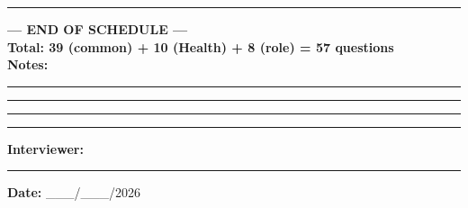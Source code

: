 \documentclass[10pt,a4paper]{article}
\begin{document}
\vspace{3pt}\noindent\rule{\textwidth}{1pt}
\begin{center}
{\large\bfseries --- END OF SCHEDULE ---}\\[2pt]
\textbf{Total: 39 (common) + 10 (Health) + 8 (role) = 57 questions}\\[8pt]
\textbf{Notes:}\vspace{3pt}

\rule{\textwidth}{0.4pt}\vspace{3pt}
\rule{\textwidth}{0.4pt}\vspace{3pt}
\rule{\textwidth}{0.4pt}\vspace{3pt}
\rule{\textwidth}{0.4pt}\vspace{4pt}

\textbf{Interviewer:} \rule{5cm}{0.4pt}\qquad\textbf{Date:} \_\_\_/\_\_\_/2026
\end{center}
\end{document}
